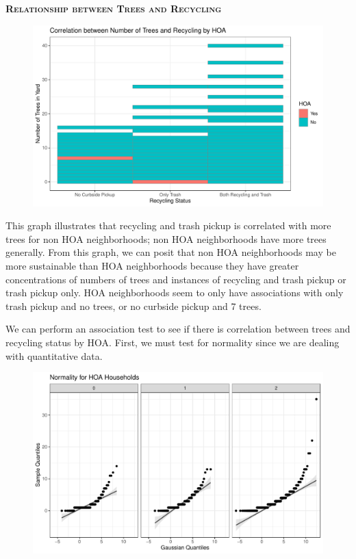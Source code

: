\documentclass{article}
\begin{document}
\newpage
\textsc{\textbf{Relationship between Trees and Recycling}}
\newline
\newline
\begin{figure}[H]
		\centering
\includegraphics{exam23-034}
		\label{Fig:plot12}
	\end{figure}
This graph illustrates that recycling and trash pickup is correlated with more trees for non HOA neighborhoods; non HOA neighborhoods have more trees generally. From this graph, we can posit that non HOA neighborhoods may be more sustainable than HOA neighborhoods because they have greater concentrations of numbers of trees and instances of recycling and trash pickup or trash pickup only. HOA neighborhoods seem to only have associations with only trash pickup and no trees, or no curbside pickup and 7 trees.

We can perform an association test to see if there is correlation between trees and recycling status by HOA. First, we must test for normality since we are dealing with quantitative data.  
\newline
\begin{figure}[H]
		\centering
\includegraphics{exam23-035}
		\label{Fig:plot13}
	\end{figure}
	
\end{document}
